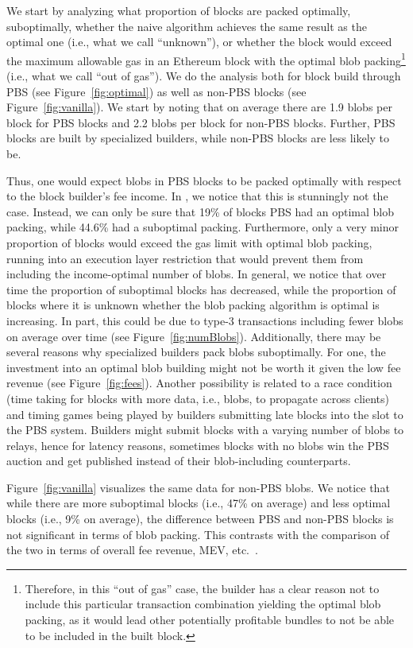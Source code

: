 We start by analyzing what proportion of blocks are packed optimally, suboptimally, whether the naive algorithm achieves the same result as the optimal one (i.e., what we call ``unknown''), or whether the block would exceed the maximum allowable gas in an Ethereum block with the optimal blob packing\footnote{Therefore, in this ``out of gas'' case, the builder has a clear reason not to include this particular transaction combination yielding the optimal blob packing, as it would lead other potentially profitable bundles to not be able to be included in the built block.} (i.e., what we call ``out of gas''). We do the analysis both for block build through PBS (see Figure~\ref{fig:optimal}) as well as non-PBS blocks (see Figure~\ref{fig:vanilla}). We start by noting that on average there are 1.9 blobs per block for PBS blocks and 2.2 blobs per block for non-PBS blocks. Further, PBS blocks are built by specialized builders, while non-PBS blocks are less likely to be. 

Thus, one would expect blobs in PBS blocks to be packed optimally with respect to the block builder's fee income. In , we notice that this is stunningly not the case. Instead, we can only be sure that 19\% of blocks PBS had an optimal blob packing, while 44.6\% had a suboptimal packing. Furthermore, only a very minor proportion of blocks would exceed the gas limit with optimal blob packing, running into an execution layer restriction that would prevent them from including the income-optimal number of blobs. In general, we notice that over time the proportion of suboptimal blocks has decreased, while the proportion of blocks where it is unknown whether the blob packing algorithm is optimal is increasing. In part, this could be due to type-3 transactions including fewer blobs on average over time (see Figure~\ref{fig:numBlobs}). Additionally, there may be several reasons why specialized builders pack blobs suboptimally.
For one, the investment into an optimal blob building might not be worth it given the low fee revenue (see Figure~\ref{fig:fees}).
Another possibility is related to a race condition (time taking for blocks with more data, i.e., blobs, to propagate across clients) and timing games being played by builders submitting late blocks into the slot to the PBS system. Builders might submit blocks with a varying number of blobs to relays, hence for latency reasons, sometimes blocks with no blobs win the PBS auction and get published instead of their blob-including counterparts.

Figure~\ref{fig:vanilla} visualizes the same data for non-PBS blobs. We notice that while there are more suboptimal blocks (i.e., 47\% on average) and less optimal blocks (i.e., 9\% on average), the difference between PBS and non-PBS blocks is not significant in terms of blob packing. This contrasts with the comparison of the two in terms of overall fee revenue, MEV, etc.~\parencite{heimbach2023ethereum}. 


